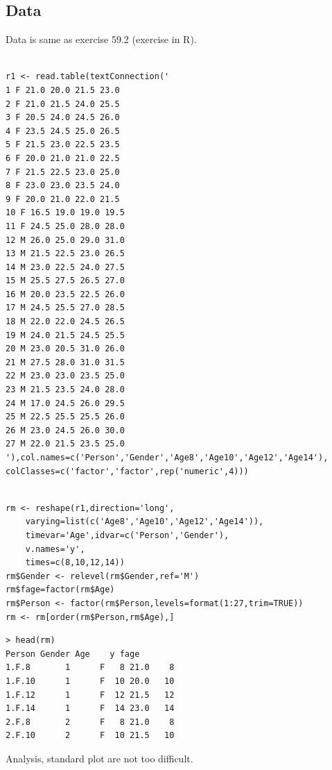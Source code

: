 \documentclass[a4paper,12pt]{article}
\begin{document}
\subsection{Data}
Data is same as exercise 59.2 (exercise in R).
\begin{framed}
\begin{verbatim}

r1 <- read.table(textConnection('
1 F 21.0 20.0 21.5 23.0
2 F 21.0 21.5 24.0 25.5
3 F 20.5 24.0 24.5 26.0
4 F 23.5 24.5 25.0 26.5
5 F 21.5 23.0 22.5 23.5
6 F 20.0 21.0 21.0 22.5
7 F 21.5 22.5 23.0 25.0
8 F 23.0 23.0 23.5 24.0
9 F 20.0 21.0 22.0 21.5
10 F 16.5 19.0 19.0 19.5
11 F 24.5 25.0 28.0 28.0
12 M 26.0 25.0 29.0 31.0
13 M 21.5 22.5 23.0 26.5
14 M 23.0 22.5 24.0 27.5
15 M 25.5 27.5 26.5 27.0
16 M 20.0 23.5 22.5 26.0
17 M 24.5 25.5 27.0 28.5
18 M 22.0 22.0 24.5 26.5
19 M 24.0 21.5 24.5 25.5
20 M 23.0 20.5 31.0 26.0
21 M 27.5 28.0 31.0 31.5
22 M 23.0 23.0 23.5 25.0
23 M 21.5 23.5 24.0 28.0
24 M 17.0 24.5 26.0 29.5
25 M 22.5 25.5 25.5 26.0
26 M 23.0 24.5 26.0 30.0
27 M 22.0 21.5 23.5 25.0
'),col.names=c('Person','Gender','Age8','Age10','Age12','Age14'),
colClasses=c('factor','factor',rep('numeric',4)))

\end{verbatim}
\end{framed}

\begin{framed}
\begin{verbatim}

rm <- reshape(r1,direction='long',
    varying=list(c('Age8','Age10','Age12','Age14')),
    timevar='Age',idvar=c('Person','Gender'),
    v.names='y',
    times=c(8,10,12,14))
rm$Gender <- relevel(rm$Gender,ref='M')
rm$fage=factor(rm$Age)
rm$Person <- factor(rm$Person,levels=format(1:27,trim=TRUE))
rm <- rm[order(rm$Person,rm$Age),]
\end{verbatim}
\end{framed}

\begin{verbatim}
> head(rm)
Person Gender Age    y fage
1.F.8       1      F   8 21.0    8
1.F.10      1      F  10 20.0   10
1.F.12      1      F  12 21.5   12
1.F.14      1      F  14 23.0   14
2.F.8       2      F   8 21.0    8
2.F.10      2      F  10 21.5   10

\end{verbatim}


Analysis, standard plot are not too difficult.
\end{document}
